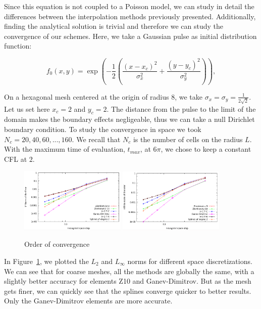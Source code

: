 \documentclass[proc]{edpsmath}
\newcommand{\blue}[1]{\textcolor{blue}{#1}}
\begin{document}
Since this equation is not coupled to a Poisson model, we can study in detail the differences between the interpolation methods previously presented.	Additionally, finding the analytical solution is trivial and therefore we can study the convergence of our schemes. Here, we take a Gaussian pulse as initial distribution function:

	\begin{equation}
	 f_0(x,y) = \exp  \left( -\dfrac{1}{2} \left( \dfrac{(x - x_c)^2}{\sigma_x^2} + \dfrac{(y - y_c)^2}{\sigma_y^2  } \right)   \right ), 
	\end{equation}

On a hexagonal mesh centered at the origin of radius $8$,  we take  $\sigma_x = \sigma_y = \frac{1}{2\sqrt{2}}$. Let us set here $x_c = 2$ and $y_c = 2$. The distance from the pulse to the limit of the domain makes the boundary effects negligeable, thus we can take a null Dirichlet boundary condition.  To study the convergence in space we took $N_c = 20, 40, 60, ..., 160$. We recall that $N_c$ is the number of cells on the radius $L$. With the maximum time of evaluation, $t_{max}$, at $6 \pi$, we chose to keep a constant CFL at $2$.



\begin{figure}[h!]
	\includegraphics[width=0.45\textwidth]{figures/l2.png}
	\includegraphics[width=0.45\textwidth]{figures/inf_l.png}
	\caption{Order of convergence}
	\label{fig:circ_convergence}
\end{figure}


In Figure~\ref{fig:circ_convergence}, we plotted the $L_2$ and $L_\infty$ norms for different space discretizations. We can see that for coarse meshes, all the methods are globally the same, with a slightly better accuracy for elements Z10 and Ganev-Dimitrov. But as the mesh gets finer, we can quickly see that the splines converge quicker to better results. Only the Ganev-Dimitrov elements are more accurate. 
\end{document}
